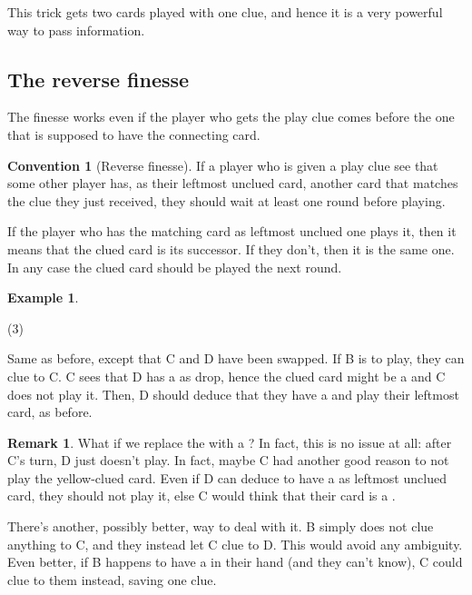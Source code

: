 \documentclass[a4paper]{article}
\theoremstyle{plain}
\theoremstyle{definition}
\newtheorem{remark}[theorem]{Remark}
\newtheorem{example}[theorem]{Example}
\newtheorem{convention}[theorem]{Convention}
\begin{document}
This trick gets two cards played with one clue, and hence it is a very powerful way to pass information.

\subsection{The reverse finesse}

The finesse works even if the player who gets the play clue comes before the one that is supposed to have the connecting card. 

\begin{convention}[Reverse finesse]
	If a player who is given a play clue see that some other player has, as their leftmost unclued card, another card that matches the clue they just received, they should wait at least one round before playing.
\end{convention}

If the player who has the matching card as leftmost unclued one plays it, then it means that the clued card is its successor. If they don't, then it is the same one. In any case the clued card should be played the next round.

\begin{example}
	\hfill
	\begin{tasks}(3)
		\task[+]      
		\task[A]    
		\task[B]    
		\task[C]    
		\task[D]    
		\task[E]    
	\end{tasks}
	
	Same as before, except that C and D have been swapped. If B is to play, they can clue  to C. C sees that D has a  as drop, hence the clued card might be a  and C does not play it. Then, D should deduce that they have a  and play their leftmost card, as before.
\end{example}

\begin{remark}
	What if we replace the  with a ? In fact, this is no issue at all: after C's turn, D just doesn't play. In fact, maybe C had another good reason to not play the yellow-clued card. Even if D can deduce to have a  as leftmost unclued card, they should not play it, else C would think that their card is a .
	
	There's another, possibly better, way to deal with it. B simply does not clue anything to C, and they instead let C clue  to D. This would avoid any ambiguity. Even better, if B happens to have a  in their hand (and they can't know), C could clue  to them instead, saving one clue.
\end{remark}
\end{document}
